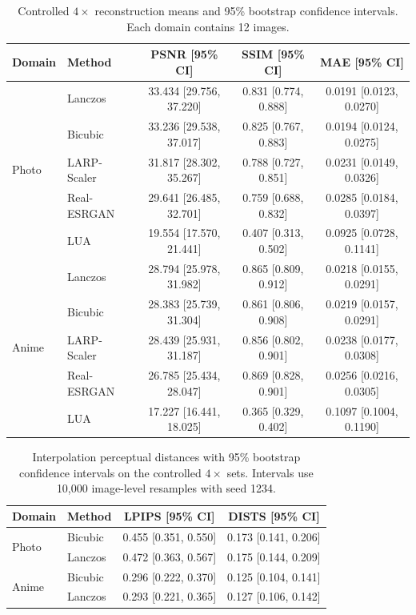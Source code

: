 \documentclass[10pt]{article}
\newcommand{\method}{LARP-Scaler\xspace}
\begin{document}
\begin{table}[H]
  \centering
  \caption{Controlled $4\times$ reconstruction means and 95\% bootstrap
  confidence intervals. Each domain contains 12 images.}
  \label{tab:controlled_ci}
  \scriptsize
  \setlength{\tabcolsep}{4pt}
  \begin{tabular}{llccc}
    \toprule
    Domain & Method & PSNR [95\% CI] & SSIM [95\% CI] & MAE [95\% CI]\\
    \midrule
    \multirow{5}{*}{Photo}
      & Lanczos & 33.434 [29.756, 37.220] & 0.831 [0.774, 0.888] & 0.0191 [0.0123, 0.0270]\\
      & Bicubic & 33.236 [29.538, 37.017] & 0.825 [0.767, 0.883] & 0.0194 [0.0124, 0.0275]\\
      & \method & 31.817 [28.302, 35.267] & 0.788 [0.727, 0.851] & 0.0231 [0.0149, 0.0326]\\
      & Real-ESRGAN & 29.641 [26.485, 32.701] & 0.759 [0.688, 0.832] & 0.0285 [0.0184, 0.0397]\\
      & LUA & 19.554 [17.570, 21.441] & 0.407 [0.313, 0.502] & 0.0925 [0.0728, 0.1141]\\
    \midrule
    \multirow{5}{*}{Anime}
      & Lanczos & 28.794 [25.978, 31.982] & 0.865 [0.809, 0.912] & 0.0218 [0.0155, 0.0291]\\
      & Bicubic & 28.383 [25.739, 31.304] & 0.861 [0.806, 0.908] & 0.0219 [0.0157, 0.0291]\\
      & \method & 28.439 [25.931, 31.187] & 0.856 [0.802, 0.901] & 0.0238 [0.0177, 0.0308]\\
      & Real-ESRGAN & 26.785 [25.434, 28.047] & 0.869 [0.828, 0.901] & 0.0256 [0.0216, 0.0305]\\
      & LUA & 17.227 [16.441, 18.025] & 0.365 [0.329, 0.402] & 0.1097 [0.1004, 0.1190]\\
    \bottomrule
  \end{tabular}
\end{table}

\begin{table}[H]
  \centering
  \caption{Interpolation perceptual distances with 95\% bootstrap confidence
  intervals on the controlled $4\times$ sets. Intervals use 10,000 image-level
  resamples with seed 1234.}
  \label{tab:perceptual_interpolation_ci}
  \small
  \setlength{\tabcolsep}{5pt}
  \begin{tabular}{llcc}
    \toprule
    Domain & Method & LPIPS [95\% CI] & DISTS [95\% CI]\\
    \midrule
    \multirow{2}{*}{Photo}
      & Bicubic & 0.455 [0.351, 0.550] & 0.173 [0.141, 0.206]\\
      & Lanczos & 0.472 [0.363, 0.567] & 0.175 [0.144, 0.209]\\
    \midrule
    \multirow{2}{*}{Anime}
      & Bicubic & 0.296 [0.222, 0.370] & 0.125 [0.104, 0.141]\\
      & Lanczos & 0.293 [0.221, 0.365] & 0.127 [0.106, 0.142]\\
    \bottomrule
  \end{tabular}
\end{table}
\end{document}
